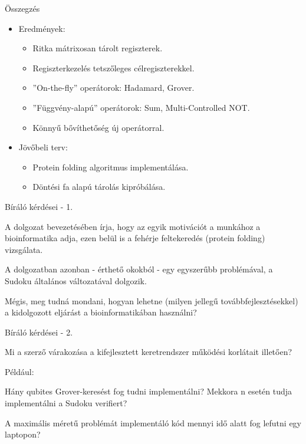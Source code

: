 \documentclass[aspectratio=169]{beamer}
\begin{document}
\begin{frame}{Összegzés}

\begin{itemize}
\item Eredmények:
\begin{itemize}
    \item Ritka mátrixosan tárolt regiszterek.
    \item Regiszterkezelés tetszőleges célregiszterekkel.
    \item ''On-the-fly'' operátorok: Hadamard, Grover.
    \item ''Függvény-alapú'' operátorok: Sum, Multi-Controlled NOT.
    \item Könnyű bővíthetőség új operátorral.
\end{itemize}
\item Jövőbeli terv:
\begin{itemize}
    \item Protein folding algoritmus implementálása.
    \item Döntési fa alapú tárolás kipróbálása.
\end{itemize}
\end{itemize}

\end{frame}



\begin{frame}{Bíráló kérdései - 1.}

A dolgozat bevezetésében írja, hogy az egyik motivációt a munkához a bioinformatika adja, ezen belül is a fehérje feltekeredés (protein folding) vizsgálata.

A dolgozatban azonban - érthető okokból - egy egyszerűbb problémával, a Sudoku általános változatával dolgozik.

Mégis, meg tudná mondani, hogyan lehetne (milyen jellegű továbbfejlesztésekkel) a kidolgozott eljárást a bioinformatikában használni?
\end{frame}

\begin{frame}{Bíráló kérdései - 2.}

Mi a szerző várakozása a kifejlesztett keretrendszer működési korlátait illetően?

Például:

Hány qubites Grover-keresést fog tudni implementálni? Mekkora n esetén tudja implementálni a Sudoku verifiert?

A maximális méretű problémát implementáló kód mennyi idő alatt fog lefutni egy laptopon?

\end{frame}
\end{document}
